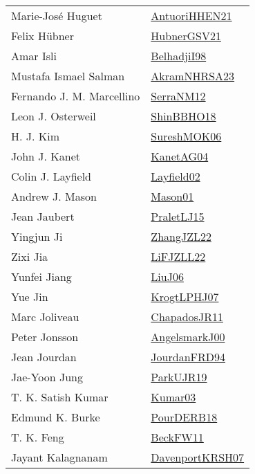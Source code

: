 {\begin{longtable}{p{4cm}p{20cm}}
Marie{-}Jos{\'{e}} Huguet & \href{papers/AntuoriHHEN21.pdf}{AntuoriHHEN21}\cite{AntuoriHHEN21} \\
Felix H{\"{u}}bner & \href{articles/HubnerGSV21.pdf}{HubnerGSV21}\cite{HubnerGSV21} \\
Amar Isli & \href{articles/BelhadjiI98.pdf}{BelhadjiI98}\cite{BelhadjiI98} \\
Mustafa Ismael Salman & \href{articles/AkramNHRSA23.pdf}{AkramNHRSA23}\cite{AkramNHRSA23} \\
Fernando J. M. Marcellino & \href{papers/SerraNM12.pdf}{SerraNM12}\cite{SerraNM12} \\
Leon J. Osterweil & \href{articles/ShinBBHO18.pdf}{ShinBBHO18}\cite{ShinBBHO18} \\
H. J. Kim & \href{}{SureshMOK06}\cite{SureshMOK06} \\
John J. Kanet & \href{}{KanetAG04}\cite{KanetAG04} \\
Colin J. Layfield & \href{}{Layfield02}\cite{Layfield02} \\
Andrew J. Mason & \href{articles/Mason01.pdf}{Mason01}\cite{Mason01} \\
Jean Jaubert & \href{papers/PraletLJ15.pdf}{PraletLJ15}\cite{PraletLJ15} \\
Yingjun Ji & \href{papers/ZhangJZL22.pdf}{ZhangJZL22}\cite{ZhangJZL22} \\
Zixi Jia & \href{papers/LiFJZLL22.pdf}{LiFJZLL22}\cite{LiFJZLL22} \\
Yunfei Jiang & \href{papers/LiuJ06.pdf}{LiuJ06}\cite{LiuJ06} \\
Yue Jin & \href{papers/KrogtLPHJ07.pdf}{KrogtLPHJ07}\cite{KrogtLPHJ07} \\
Marc Joliveau & \href{papers/ChapadosJR11.pdf}{ChapadosJR11}\cite{ChapadosJR11} \\
Peter Jonsson & \href{papers/AngelsmarkJ00.pdf}{AngelsmarkJ00}\cite{AngelsmarkJ00} \\
Jean Jourdan & \href{}{JourdanFRD94}\cite{JourdanFRD94} \\
Jae{-}Yoon Jung & \href{papers/ParkUJR19.pdf}{ParkUJR19}\cite{ParkUJR19} \\
T. K. Satish Kumar & \href{papers/Kumar03.pdf}{Kumar03}\cite{Kumar03} \\
Edmund K. Burke & \href{articles/PourDERB18.pdf}{PourDERB18}\cite{PourDERB18} \\
T. K. Feng & \href{}{BeckFW11}\cite{BeckFW11} \\
Jayant Kalagnanam & \href{papers/DavenportKRSH07.pdf}{DavenportKRSH07}\cite{DavenportKRSH07} \\

\end{longtable}}
